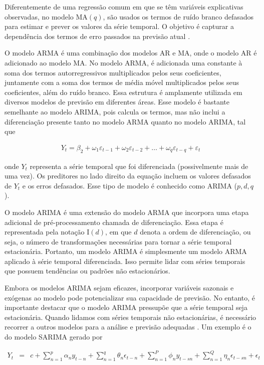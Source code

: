  Diferentemente de uma regressão comum em que se têm variáveis explicativas observadas, no modelo MA$(q)$, são usados os termos de ruído branco defasados para estimar e prever os valores da série temporal. O objetivo é capturar a dependência dos termos de erro passados na previsão atual \cite{arima}.
 
 O modelo ARMA é uma combinação dos modelos AR  e MA, onde o modelo AR é adicionado ao modelo MA. No modelo ARMA, é adicionada uma constante à soma dos termos autorregressivos multiplicados pelos seus coeficientes, juntamente com a soma dos termos de média móvel multiplicados pelos seus coeficientes, além do ruído branco. Essa estrutura é amplamente utilizada em diversos modelos de previsão em diferentes áreas. Esse modelo é bastante semelhante ao modelo ARIMA, pois calcula os termos, mas não inclui a diferenciação presente tanto no modelo ARMA quanto no modelo ARIMA, tal que
 
 \begin{eqnarray}
 	Y_t = \beta_2 + \omega_1\varepsilon_{t-1} + \omega_2 \varepsilon_{t-2} +\ldots+ \omega_q \varepsilon_{t-q} + \varepsilon_t \label{arima}
 \end{eqnarray}
 
 \noindent onde $Y_t$ representa a série temporal que foi diferenciada (possivelmente mais de uma vez). Os preditores no lado direito da equação incluem os valores defasados de $Y_t$ e os erros defasados. Esse tipo de modelo é conhecido como ARIMA ($p, d, q$).
 
 O modelo ARIMA é uma extensão do modelo ARMA que incorpora uma etapa adicional de pré-processamento chamada de diferenciação. Essa etapa é representada pela notação I$(d)$, em que $d$ denota a ordem de diferenciação, ou seja, o número de transformações necessárias para tornar a série temporal estacionária. Portanto, um modelo ARIMA é simplesmente um modelo ARMA aplicado à série temporal diferenciada. Isso permite lidar com séries temporais que possuem tendências ou padrões não estacionários.
 
 Embora os modelos ARIMA sejam eficazes, incorporar variáveis sazonais e exógenas ao modelo pode potencializar sua capacidade de previsão. No entanto, é importante destacar que o modelo ARIMA pressupõe que a série temporal seja estacionária. Quando lidamos com séries temporais não estacionárias, é necessário recorrer a outros modelos para a análise e previsão adequadas  \cite{arima}. Um exemplo é o do modelo SARIMA gerado por
 
 \begin{eqnarray}
 	Y_t&=&c+\sum_{n=1}^p \alpha_n y_{t-n}+\sum_{n=1}^q \theta_n \epsilon_{t-n}+\sum_{n=1}^P \phi_n y_{t-s n}+\sum_{n=1}^Q \eta_n \epsilon_{t-s n}+\epsilon_t \label{sarima}
 \end{eqnarray}
 

